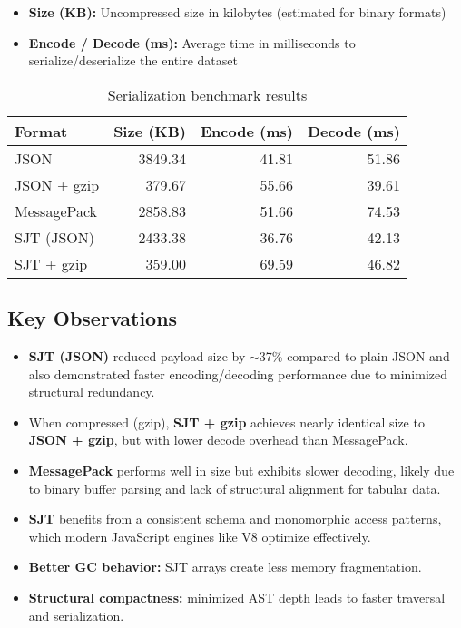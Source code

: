 \documentclass[12pt]{article}
\begin{document}
\begin{itemize}
  \item \textbf{Size (KB):} Uncompressed size in kilobytes (estimated for binary formats)
  \item \textbf{Encode / Decode (ms):} Average time in milliseconds to serialize/deserialize the entire dataset
\end{itemize}

\begin{table}[h!]
\centering
\begin{tabular}{@{}lrrr@{}}
\toprule
\textbf{Format} & \textbf{Size (KB)} & \textbf{Encode (ms)} & \textbf{Decode (ms)} \\
\midrule
JSON           & 3849.34 & 41.81 & 51.86 \\
JSON + gzip    & 379.67  & 55.66 & 39.61 \\
MessagePack    & 2858.83 & 51.66 & 74.53 \\
SJT (JSON)     & 2433.38 & 36.76 & 42.13 \\
SJT + gzip     & 359.00  & 69.59 & 46.82 \\
\bottomrule
\end{tabular}
\caption{Serialization benchmark results}
\end{table}

\subsection*{Key Observations}
\begin{itemize}
  \item \textbf{SJT (JSON)} reduced payload size by $\sim$37\% compared to plain JSON and also demonstrated faster encoding/decoding performance due to minimized structural redundancy.
  \item When compressed (gzip), \textbf{SJT + gzip} achieves nearly identical size to \textbf{JSON + gzip}, but with lower decode overhead than MessagePack.
  \item \textbf{MessagePack} performs well in size but exhibits slower decoding, likely due to binary buffer parsing and lack of structural alignment for tabular data.
  \item \textbf{SJT} benefits from a consistent schema and monomorphic access patterns, which modern JavaScript engines like V8 optimize effectively.
  \item \textbf{Better GC behavior:} SJT arrays create less memory fragmentation.
  \item \textbf{Structural compactness:} minimized AST depth leads to faster traversal and serialization.
\end{itemize}
\end{document}
